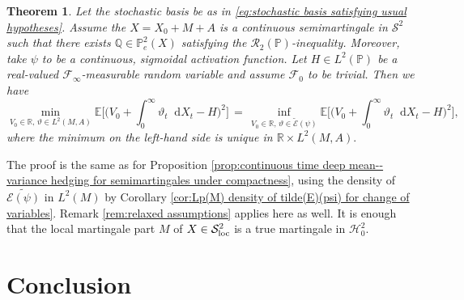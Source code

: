 \documentclass[11pt,a4paper,twoside,openany]{report}
\numberwithin{equation}{section}
\newcommand{\diff}{\mathop{}\!\mathrm{d}}
\theoremstyle{plain} %
\newtheorem{theorem}{Theorem}[section]
\theoremstyle{definition} %
\theoremstyle{remark} %
\begin{document}
\begin{theorem}\label{thm:continuous time deep mean--variance hedging for semimartingales}
Let the stochastic basis be as in \eqref{eq:stochastic basis satisfying usual hypotheses}.
    Assume the \(X=X_0+M+A\) is a continuous semimartingale in \(\mathcal{S}^2\) such that there exists \(\mathbb{Q}\in\mathbb{P}_e^2(X)\) satisfying the \(\mathcal{R}_2(\mathbb{P})\)-inequality. Moreover, take \(\psi\) to be a continuous, sigmoidal activation function. Let \(H\in L^2(\mathbb{P})\) be a real-valued \(\mathcal{F}_{\infty}\)-measurable random variable and assume \(\mathcal{F}_0\) to be trivial. Then we have
\begin{equation}\label{eq:martingale setup, continuous deep variance hedging}
    \min_{V_0\in\mathbb{R},\,\vartheta\in L^2(M,A)}\mathbb{E}\bigg[\bigg(V_0+\int_{0}^{\infty}\vartheta_t\diff X_t-H\bigg)^2\bigg]
    \,=\,\inf_{V_0\in\mathbb{R},\,\vartheta\in \widetilde{\mathcal{E}}(\psi)}
    \mathbb{E}\bigg[\bigg(V_0+\int_{0}^{\infty}\vartheta_t\diff X_t-H\bigg)^2\bigg],
\end{equation}
where the minimum on the left-hand side is unique in \(\mathbb{R}\times L^2(M,A).\)
\end{theorem}
The proof is the same as for Proposition \ref{prop:continuous time deep mean--variance hedging for semimartingales under compactness}, using the density of \(\widetilde{\mathcal{E}(\psi)}\) in \(L^2(M)\) by Corollary \ref{cor:Lp(M) density of tilde(E)(psi) for change of variables}.
Remark \ref{rem:relaxed assumptions} applies here as well. It is enough that the local martingale part \(M\) of \(X\in\mathcal{S}^2_{\rm{loc}}\) is a true martingale in \(\mathcal{H}_0^2\).





\chapter{Conclusion}
\end{document}
